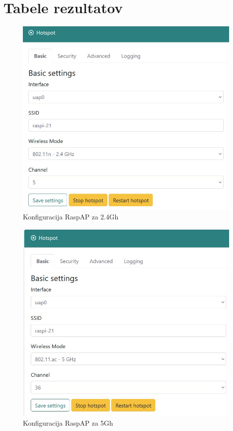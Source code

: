 \documentclass[11pt,a4paper,slovene]{article}
\begin{document}
\section{Tabele rezultatov}


\begin{figure}[H]
\includegraphics[width=\linewidth]{Conf}
\centering
\caption{Konfiguracija RaspAP za 2.4Gh}
\end{figure}


\begin{figure}[H]
\includegraphics[width=\linewidth]{5GhzConfig}
\centering
\caption{Konfiguracija RaspAP za 5Gh}
\end{figure}
\end{document}
